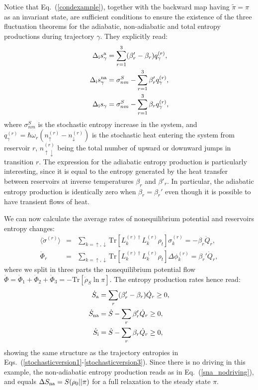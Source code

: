 \documentclass[aps,prx,twocolumn,showpacs,floatfix,superscriptaddress,graphics,longbibliography]{revtex4-1}
\newcommand{\tr}{\mathrm{Tr}}
\begin{document}
Notice that Eq.~(\ref{condexample}), together with the backward map having $\tilde{\pi}=\pi$ as an invariant state, are sufficient conditions to ensure the existence of the three fluctuation theorems 
for the adiabatic, non-adiabatic and total entropy productions during trajectory $\gamma$. They explicitly read:
\begin{align}\label{stochasticversion1}
\Delta_{\rm i} s^{\rm a}_{\gamma} & = \sum_{r=1}^3 (\beta_r' - \beta_r) q_\gamma^{(r)}, \\
\Delta_{\rm i} s^{\rm na}_\gamma & = \sigma_{n m}^S - \sum_{r=1}^3 \beta_{r}'q_\gamma^{(r)}, \\  \label{stochasticversion3}
\Delta_{\rm i} s_\gamma & = \sigma_{n m}^S - \sum_{r=1}^3 \beta_r q_\gamma^{(r)},  
\end{align}
where  $\sigma_{n m}^S$ is the stochastic entropy increase in the system, and $q_\gamma^{(r)} = \hbar \omega_r (n_{\uparrow}^{(r)} - n_{\downarrow}^{(r)})$
is the stochastic heat entering the system from reservoir $r$, $n_{\uparrow \downarrow }^{(r)}$ being  the total number of upward or downward jumps in transition $r$. The expression for the adiabatic entropy production is particularly interesting, since it is equal to the entropy generated by the heat transfer between reservoirs at inverse temperatures $\beta_r$ and $\beta'_r$. In particular, the adiabatic entropy production is identically zero when $\beta_r=\beta_r'$ even though it is possible to have transient flows of heat. 


We can now calculate the average rates of nonequilibrium potential and reservoirs entropy changes:
\begin{eqnarray}\label{dotS}
\langle \dot{\sigma}^{(r)} \rangle &=& \sum_{k =\uparrow,\downarrow} \tr[L_{k}^{(r) \dagger} L_{k}^{(r)} \rho_t] \sigma^{(r)}_k = - \beta_r \dot{Q}_r, \\
\dot{\Phi}_r &=& \sum_{k =\uparrow,\downarrow} \tr[L_{k}^{(r) \dagger} L_{k}^{(r)} \rho_t] \Delta \phi_k^{(r)} = \beta_r' \dot{Q}_r,
\end{eqnarray}
where we split in three parts the nonequilibrium potential flow $\dot{\Phi} = \dot{\Phi}_1 + \dot{\Phi}_2 + \dot{\Phi}_3
= -\tr[\dot{\rho}_S \ln \pi]$. The entropy production rates hence read:
\begin{align}
\dot{S}_{\rm a} &= \sum_r (\beta_r' - \beta_r) \dot{Q}_r \geq 0, \\
\dot{S}_{\rm na} &= \dot{S} - \sum_r \beta_r' \dot{Q}_r \geq 0, \\ 
\dot{S}_{\rm i} &= \dot{S} - \sum_r \beta_r \dot{Q}_r \geq 0, 
\end{align}
showing the same structure as the trajectory entropies in Eqs.~(\ref{stochasticversion1}-\ref{stochasticversion3}). Since there is no driving in this example, the non-adiabatic entropy production reads  as in Eq.~(\ref{sna_nodriving}), and equals $\Delta S_{\rm na}=S(\rho_0||\pi)$ for a full relaxation to the steady state $\pi$.
\end{document}
